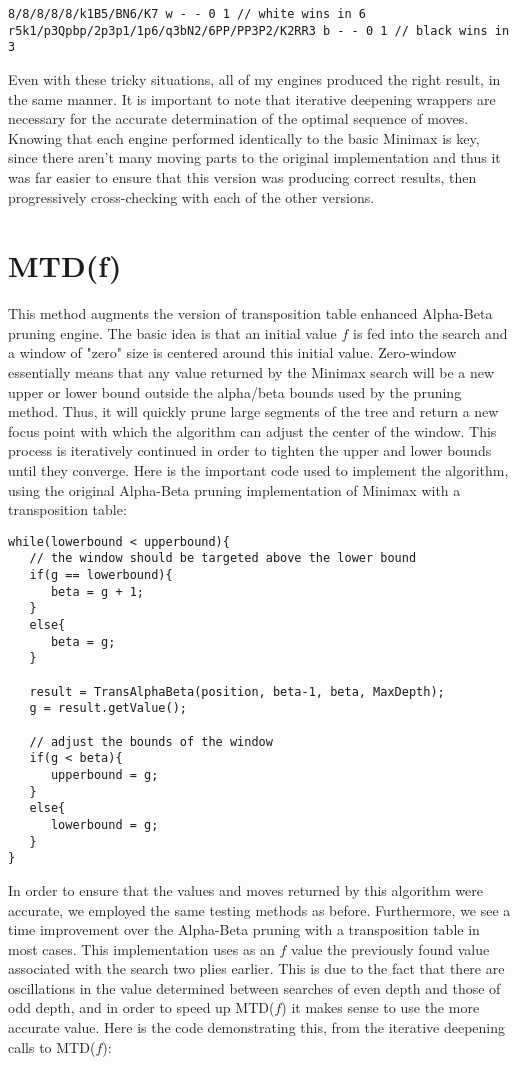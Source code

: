 \documentclass[11pt, oneside]{article}%
\begin{document}
\begin{lstlisting}
8/8/8/8/8/k1B5/BN6/K7 w - - 0 1 // white wins in 6
r5k1/p3Qpbp/2p3p1/1p6/q3bN2/6PP/PP3P2/K2RR3 b - - 0 1 // black wins in 3
\end{lstlisting}

Even with these tricky situations, all of my engines produced the right result, in the same manner.  It is important to note that iterative deepening wrappers are necessary for the accurate determination of the optimal sequence of moves.  Knowing that each engine performed identically to the basic Minimax is key, since there aren't many moving parts to the original implementation and thus it was far easier to ensure that this version was producing correct results, then progressively cross-checking with each of the other versions.
\newpage

\section{MTD(f)}
This method augments the version of transposition table enhanced Alpha-Beta pruning engine.  The basic idea is that an initial value $f$ is fed into the search and a window of "zero" size is centered around this initial value.  Zero-window essentially means that any value returned by the Minimax search will be a new upper or lower bound outside the alpha/beta bounds used by the pruning method.  Thus, it will quickly prune large segments of the tree and return a new focus point with which the algorithm can adjust the center of the window.  This process is iteratively continued in order to tighten the upper and lower bounds until they converge.  Here is the important code used to implement the algorithm, using the original Alpha-Beta pruning implementation of Minimax with a transposition table:

\begin{lstlisting}
while(lowerbound < upperbound){
   // the window should be targeted above the lower bound
   if(g == lowerbound){
      beta = g + 1;
   }
   else{
      beta = g;
   }
   
   result = TransAlphaBeta(position, beta-1, beta, MaxDepth);
   g = result.getValue();
   
   // adjust the bounds of the window
   if(g < beta){
      upperbound = g;
   }
   else{
      lowerbound = g;
   }
}
\end{lstlisting}

In order to ensure that the values and moves returned by this algorithm were accurate, we employed the same testing methods as before.  Furthermore, we see a time improvement over the Alpha-Beta pruning with a transposition table in most cases.  This implementation uses as an $f$ value the previously found value associated with the search two plies earlier.  This is due to the fact that there are oscillations in the value determined between searches of even depth and those of odd depth, and in order to speed up MTD($f$) it makes sense to use the more accurate value.  Here is the code demonstrating this, from the iterative deepening calls to MTD($f$):
\end{document}
